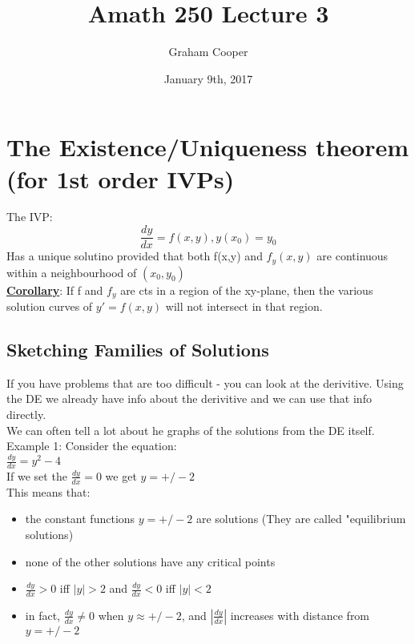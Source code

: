 \documentclass[12pt]{article}
\title{\vspace{-15ex}Amath 250 Lecture 3\vspace{-1ex}}
\date{January 9th, 2017}
\author{Graham Cooper}
\newcommand{\myt}[1]{\textbf{\underline{#1}}}
\begin{document}
	\maketitle
	
	\section*{The Existence/Uniqueness theorem (for 1st order IVPs)}
	The IVP:
	$$\frac{dy}{dx} = f(x,y), y(x_0) = y_0$$
	Has a unique solutino provided that both f(x,y) and $f_y(x,y)$ are continuous within a neighbourhood of $(x_0, y_0)$\\
	
	\myt{Corollary}: If f and $f_y$ are cts in a region of the xy-plane, then the various solution curves of $y'=f(x,y)$ will not intersect in that region.\\
	
	\subsection*{Sketching Families of Solutions}
	
	If you have problems that are too difficult - you can look at the derivitive. Using the DE we already have info about the derivitive and we can use that info directly.\\
	
	We can often tell a lot about he graphs of the solutions from the DE itself.\\
	
	Example 1: Consider the equation:\\
	$\frac{dy}{dx} = y^2 - 4$\\
	
	If we set the $\frac{dy}{dx} = 0$ we get $y = +/- 2$\\
	This means that:
	\begin{itemize}
		\item the constant functions $y = +/-2$ are solutions (They are called "equilibrium solutions)
		\item none of the other solutions have any critical points
		\item $\frac{dy}{dx} > 0$ iff $|y| > 2$ and $\frac{dy}{dx} < 0$ iff $|y| < 2$
		\item in fact, $\frac{dy}{dx} \ne 0$ when $y \approx +/-2$, and $|\frac{dy}{dx}|$ increases with distance from $y = +/-2$
	\end{itemize}


	
	
	
\end{document}
